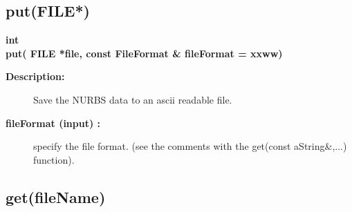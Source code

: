 \subsection{put(FILE*)}
 
\begin{flushleft} \textbf{%
int  \\ 
\settowidth{\NurbsMappingIncludeArgIndent}{put(}%
put( FILE *file, const FileFormat \& fileFormat  = xxww)
}\end{flushleft}
\begin{description}
\item[{\bf Description:}] 
   Save the NURBS data to an ascii readable file.
\item[{\bf fileFormat (input) :}]  specify the file format. (see the comments with the get(const aString\&,...) function).
\end{description}
\subsection{get(fileName)}
 
